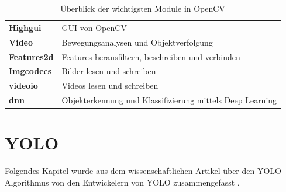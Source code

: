 \begin{table}[]
    \centering
    \begin{tabular}[h]{|l||l|}
        \hline
        \textbf{Highgui} & GUI von OpenCV \\[2.5pt]
        \textbf{Video} & Bewegungsanalysen und Objektverfolgung \\[2.5pt]
        \textbf{Features2d} & Features herausfiltern, beschreiben und verbinden \\[2.5pt]
        \textbf{Imgcodecs} & Bilder lesen und schreiben \\[2.5pt]
        \textbf{videoio} & Videos lesen und schreiben \\[2.5pt]
        \textbf{dnn} & Objekterkennung und Klassifizierung mittels Deep Learning \\ \hline
    \end{tabular}
    \caption{Überblick der wichtigsten Module in OpenCV}
    \label{tab:table_cv}
\end{table}

\section{YOLO}

Folgendes Kapitel wurde aus dem wissenschaftlichen Artikel über den YOLO Algorithmus von den Entwickelern von YOLO zusammengefasst \cite{YOLOOfficialPub}.

